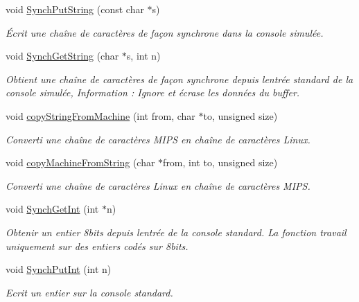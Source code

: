 \begin{DoxyCompactItemize}
void \hyperlink{class_synch_console_adda30ee11ac596b035a06eb69b13407e}{Synch\+Put\+String} (const char $\ast$s)
\begin{DoxyCompactList}\small\item\em Écrit une chaîne de caractères de façon synchrone dans la console simulée. \end{DoxyCompactList}\item 
void \hyperlink{class_synch_console_a632abb28f8b2bdbd5d9c69adf364f013}{Synch\+Get\+String} (char $\ast$s, int n)
\begin{DoxyCompactList}\small\item\em Obtient une chaîne de caractères de façon synchrone depuis l\textquotesingle{}entrée standard de la console simulée, Information \+: Ignore et écrase les données du buffer. \end{DoxyCompactList}\item 
void \hyperlink{class_synch_console_a396a17fea20cf5d90f15fcf898e29fcb}{copy\+String\+From\+Machine} (int from, char $\ast$to, unsigned size)
\begin{DoxyCompactList}\small\item\em Converti une chaîne de caractères M\+I\+PS en chaîne de caractères Linux. \end{DoxyCompactList}\item 
void \hyperlink{class_synch_console_a6d18320cf487bac83c8227afc7498a7b}{copy\+Machine\+From\+String} (char $\ast$from, int to, unsigned size)
\begin{DoxyCompactList}\small\item\em Converti une chaîne de caractères Linux en chaîne de caractères M\+I\+PS. \end{DoxyCompactList}\item 
void \hyperlink{class_synch_console_a78d924b143bcadae321144c50f971df0}{Synch\+Get\+Int} (int $\ast$n)
\begin{DoxyCompactList}\small\item\em Obtenir un entier 8bits depuis l\textquotesingle{}entrée de la console standard. La fonction travail uniquement sur des entiers codés sur 8bits. \end{DoxyCompactList}\item 
void \hyperlink{class_synch_console_a7e65587e2fb5725e30dd46204c6ed56c}{Synch\+Put\+Int} (int n)
\begin{DoxyCompactList}\small\item\em Ecrit un entier sur la console standard. \end{DoxyCompactList}\end{DoxyCompactItemize}
